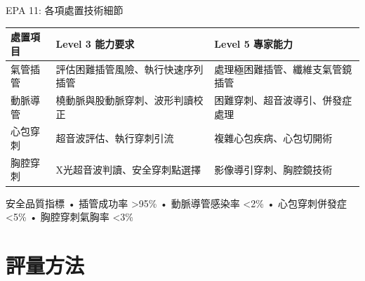 \documentclass[aspectratio=169]{beamer}
\begin{document}
\begin{frame}{EPA 11: 各項處置技術細節}
\footnotesize
\begin{table}
\centering
\begin{tabular}{|l|p{5cm}|p{5cm}|}
\hline
\rowcolor{emergency_blue!20}
\textbf{處置項目} & \textbf{Level 3 能力要求} & \textbf{Level 5 專家能力} \\
\hline
氣管插管 & 評估困難插管風險、執行快速序列插管 & 處理極困難插管、纖維支氣管鏡插管 \\
\hline
動脈導管 & 橈動脈與股動脈穿刺、波形判讀校正 & 困難穿刺、超音波導引、併發症處理 \\
\hline
心包穿刺 & 超音波評估、執行穿刺引流 & 複雜心包疾病、心包切開術 \\
\hline
胸腔穿刺 & X光超音波判讀、安全穿刺點選擇 & 影像導引穿刺、胸腔鏡技術 \\
\hline
\end{tabular}
\end{table}

\vspace{0.3cm}
\begin{alertblock}{安全品質指標}
• 插管成功率 >95\% • 動脈導管感染率 <2\% • 心包穿刺併發症 <5\% • 胸腔穿刺氣胸率 <3\%
\end{alertblock}
\end{frame}

\section{評量方法}
\end{document}
